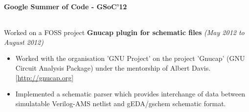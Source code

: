 \documentclass[a4paper,11pt]{article}
\newcommand{\isep}{-2 pt}
\newcommand{\resheading}[1]{{\small \colorbox{mygrey}{\begin{minipage}{0.975\textwidth}{\textbf{#1 \vphantom{p\^{E}}}}\end{minipage}}}}
\begin{document}
\begin{itemize}
\begin{comment}
    \item \textbf{Processor design on FPGA}  \hfill \emph{(Guided by Prof. V. Singh, EE739 - Spring 2013)}
        \begin{itemize}
            \item Involves designing a specific processor architecture on FPGA
            \item Literature survey about available processor architectures, proposing a better one and demonstrating using FPGA
        \end{itemize}
\end{comment}

\end{itemize}

\resheading{\textbf{\large Google Summer of Code - GSoC'12}} \\

\hspace{1mm} Worked on a FOSS project \textbf{Gnucap plugin for schematic files} \hfill \emph{(May 2012 to August 2012)} \\[-0.6cm]
    \begin{itemize}
        \item Worked with the organisation 'GNU Project' on the project 'Gnucap' (GNU Circuit Analysis Package) under the mentorship of Albert Davis. \hfill  [\url{http://gnucap.org}] \\[-0.6cm]
        \item Implemented a schematic parser which provides interchange of data between simulatable Verilog-AMS netlist and gEDA/gschem schematic format.
    \end{itemize}
\end{document}
